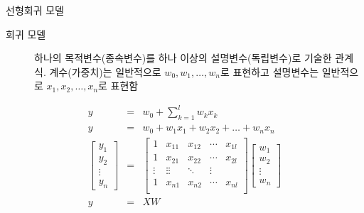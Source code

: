\documentclass[10pt,t]{beamer}
\begin{document}
\begin{frame}[fragile] {선형회귀 모델}
    \begin{description}
        \item[회귀 모델] 하나의 목적변수(종속변수)를 하나 이상의 설명변수(독립변수)로 기술한 관계식. 계수(가중치)는 일반적으로 $w_0, w_1, \ldots, w_n$로 표현하고 설명변수는 일반적으로 $x_1, x_2, \ldots, x_n$로 표현함
    \end{description}
    \begin{eqnarray*}
        y&=& w_0 + \sum_{k=1}^l w_k x_k\\
        y &=& w_0 +w_1x_1+w_2x_2+\ldots+w_n x_n\\
        \begin{bmatrix}
            y_1\\
            y_2\\
            \vdots\\
            y_n
        \end{bmatrix} &=& \begin{bmatrix}
            1 & x_{11} & x_{12} & \cdots & x_{1l} \\
            1 & x_{21} & x_{22} & \cdots & x_{2l} \\
            \vdots & \vdots \vdots & \ddots & \vdots \\
            1 & x_{n1} & x_{n2} & \cdots & x_{nl} \\
        \end{bmatrix}
        \begin{bmatrix}
            w_1\\
            w_2\\
            \vdots\\
            w_n
        \end{bmatrix}\\
        y&=&XW
    \end{eqnarray*}
\end{frame}
\end{document}

